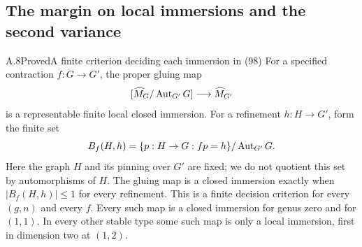 \subsection{The margin on local immersions and the second variance}

\begin{result}{A.8}{Proved}{A finite criterion deciding each immersion in (98)}
For a specified contraction $f:G\to G'$, the proper gluing map
\[
 [\widehat M_G/\operatorname{Aut}_{G'}G]\longrightarrow\widehat M_{G'}
\]
is a representable finite local closed immersion. For a refinement $h:H\to G'$, form the finite set
\[
 B_f(H,h)=\{p:H\to G:f p=h\}/\operatorname{Aut}_{G'}G.
\]
Here the graph $H$ and its pinning over $G'$ are fixed; we do not quotient this set by automorphisms of $H$. The gluing map is a closed immersion exactly when $|B_f(H,h)|\leq1$ for every refinement. This is a finite decision criterion for every $(g,n)$ and every $f$. Every such map is a closed immersion for genus zero and for $(1,1)$. In every other stable type some such map is only a local immersion, first in dimension two at $(1,2)$.
\end{result}
